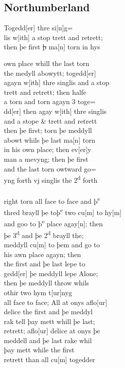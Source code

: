 \documentclass[12pt,letter]{article} %
\newcommand{
\srcpgL}[1]{\noindent{\hspace{-1.85in}\color{Gray}{\rule[0.5ex]{6.0in}{1pt}~#1}}\\
}
\newcommand{\srcpg}[1]{\srcpgL{#1}}
\newcommand{\tmnL}[1]{%
\reversemarginpar\marginparsep=11mm{\marginnote{#1}}
}
\newcommand{\tmn}[1]{
\tmnL{#1}
}
\begin{document}
\subsection{Northumberland}
\tmn{Northhu{[}m{]}b\\land de 3{[}bus{]}}Togedd{[}er{]} thre si{[}n{]}g=\\
lis w{[}ith{]} a stop trett and retrett;\\
then þe first \sout{þ} ma{[}n{]} torn in hys\\
\tmn{Trace}own place whill the last torn\\
the medyll abowytt; togedd{[}er{]}\\
agayn w{[}ith{]} thre singlis and a stop\\
trett and retrett; then halfe\\
a torn and torn agayn 3 toge=\\
dd{[}er{]} then agay w{[}ith{]} thre singlis\\
and a stope \& trett and retrett\\
then þe first; torn þe meddyll\\
abowt whils þe last ma{[}n{]} torn\\
in his own place; then ev{[}er{]}y\\
man a mevyng; then þe first\\
and the last torn owtward go=\\
yng forth vj singlis the 2\textsuperscript{d} forth \\
\srcpg{72}
right torn all face to face and þ\textsuperscript{e}\\
thred brayll þe toþ\textsuperscript{e} two cu{[}m{]} to hy{[}m{]}\\
and goo to þ\textsuperscript{e} place agay{[}n{]}; then\\
þe 3\textsuperscript{d} and þe 2\textsuperscript{d} brayll the;\\
meddyll cu{[}m{]} to þem and go to\\
his awn place agayn; then\\
the first and þe last lepe to\\
gedd{[}er{]} þe meddyll lepe Alone;\\
then þe meddyll throw whils\\
othir two hym t{[}ur{]}nyg\\
all face to face; All at onys aflo{[}ur{]}\\
delice the first and þe meddyl\\
rak tell þay mett whill þe last;\\
retrett; aflo{[}ur{]} delice at onys þe\\
meddell and þe last rake whil\\
þay mett while the first\\
retrett than all cu{[}m{]} togedder

    \nocite{*}
    
    
\end{document}
